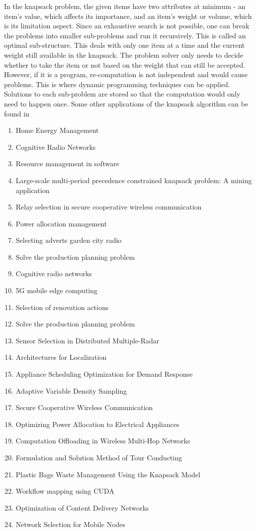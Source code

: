 \documentclass[12pt]{article}
\begin{document}
In the knapsack problem, the given items have two attributes at minimum - an item’s value, which affects its importance, and an item’s weight or volume, which is its limitation aspect. Since an exhaustive search is not possible, one can break the problems into smaller sub-problems and run it recursively. This is called an optimal sub-structure. This deals with only one item at a time and the current weight still available in the knapsack. The problem solver only needs to decide whether to take the item or not based on the weight that can still be accepted. However, if it is a program, re-computation is not independent and would cause problems. This is where dynamic programming techniques can be applied. Solutions to each sub-problem are stored so that the computation would only need to happen once. Some other applications of the knapsack algorithm can be found in \newline

\begin{enumerate}
    \item Home Energy Management
    \item Cognitive Radio Networks
    \item Resource management in software
    \item Large-scale multi-period precedence constrained knapsack problem: A mining application
    \item Relay selection in secure cooperative wireless communication
    \item Power allocation management
    \item Selecting adverts garden city radio
    \item Solve the production planning problem
    \item Cognitive radio networks
    \item 5G mobile edge computing
    \item Selection of renovation actions
    \item Solve the production planning problem
    \item Sensor Selection in Distributed Multiple-Radar
    \item Architectures for Localization
    \item Appliance Scheduling Optimization for Demand Response
    \item Adaptive Variable Density Sampling
    \item Secure Cooperative Wireless Communication
    \item Optimizing Power Allocation to Electrical Appliances
    \item Computation Offloading in Wireless Multi-Hop Networks
    \item Formulation and Solution Method of Tour Conducting
    \item Plastic Bags Waste Management Using the Knapsack Model
    \item Workflow mapping using CUDA
    \item Optimization of Content Delivery Networks
    \item Network Selection for Mobile Nodes
\end{enumerate}
\end{document}
